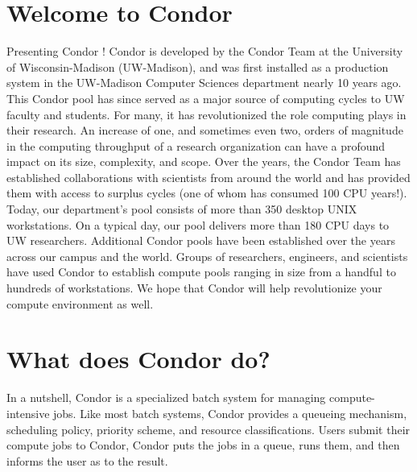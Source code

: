 \section{Welcome to Condor}  
%
% 
%

Presenting Condor \VersionNotice! Condor is developed by
the Condor Team at the University of Wisconsin-Madison (UW-Madison), and
was first installed as a production system in the UW-Madison Computer
Sciences department nearly 10 years ago. This Condor pool has since
served as a major source of computing cycles to UW faculty and students.
For many, it has revolutionized the role computing plays in their
research. An increase of one, and sometimes even two, orders of
magnitude in the computing throughput of a research organization can
have a profound impact on its size, complexity, and scope. Over the
years, the Condor Team has established collaborations with scientists
from around the world and has provided them with access to surplus
cycles (one of whom has consumed 100 CPU years!). Today, our
department's pool consists of more than 350 desktop UNIX workstations.
On a typical day, our pool delivers more than 180 CPU days to UW
researchers. Additional Condor pools have been established over the
years across our campus and the world. Groups of researchers, engineers,
and scientists have used Condor to establish compute pools ranging in
size from a handful to hundreds of workstations. We hope that Condor
will help revolutionize your compute environment as well.


\section{What does Condor do?}


In a nutshell, Condor is a specialized batch system 
for managing
compute-intensive jobs.  Like most batch systems, Condor provides a
queueing mechanism, scheduling policy, priority scheme, and resource
classifications.  Users submit their compute jobs to Condor, Condor puts
the jobs in a queue, runs them, and then informs the user as to the
result.

